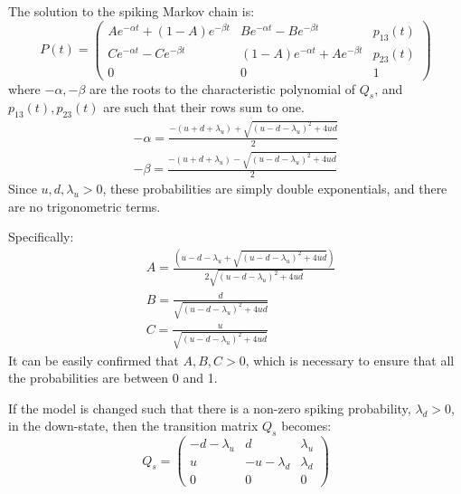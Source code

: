 The solution to the spiking Markov chain is:
\begin{equation}
P(t)  = \begin{pmatrix} Ae^{-\alpha t} + (1-A)e^{-\beta t} & Be^{-\alpha t} - Be^{-\beta t} & p_{13}(t)\\ 
Ce^{-\alpha t} - Ce^{-\beta t} & (1-A)e^{-\alpha t} +  Ae^{-\beta t} & p_{23}(t) \\
 0 & 0 & 1 \end{pmatrix}
\end{equation}
where $-\alpha,-\beta$ are the roots to the characteristic polynomial of $Q_s$, and $p_{13}(t), p_{23}(t)$ are such that their rows sum to one.
\begin{equation}
\begin{split}
-\alpha = \frac{-(u+d+\lambda_u) + \sqrt{(u-d-\lambda_u)^2 + 4ud}}{2}\\
-\beta = \frac{-(u+d+\lambda_u) - \sqrt{(u-d-\lambda_u)^2 + 4ud}}{2}
\end{split}
\end{equation}
Since $u,d,\lambda_u >0$, these probabilities are simply double exponentials, and there are no trigonometric terms.

Specifically:
\begin{equation}
\begin{split}
&A = \frac{\left(u-d-\lambda_u+\sqrt{(u-d-\lambda_u)^2+4ud}\right)}{2\sqrt{(u-d-\lambda_u)^2+4ud}}\\
&B = \frac{d}{\sqrt{(u-d-\lambda_u)^2+4ud}}\\
&C = \frac{u}{\sqrt{(u-d-\lambda_u)^2+4ud}}
\end{split}
\end{equation}
It can be  easily confirmed that $A,B,C>0$, which is necessary to ensure that all the probabilities are between 0 and 1.

If the model is changed such that there is a non-zero spiking probability, $\lambda_d>0$, in the down-state, then the transition matrix $Q_s$ becomes:
\begin{equation}
Q_s = \begin{pmatrix} -d-\lambda_u & d & \lambda_u \\ u & -u-\lambda_d & \lambda_d \\ 0 & 0 & 0 \end{pmatrix}
\end{equation}

